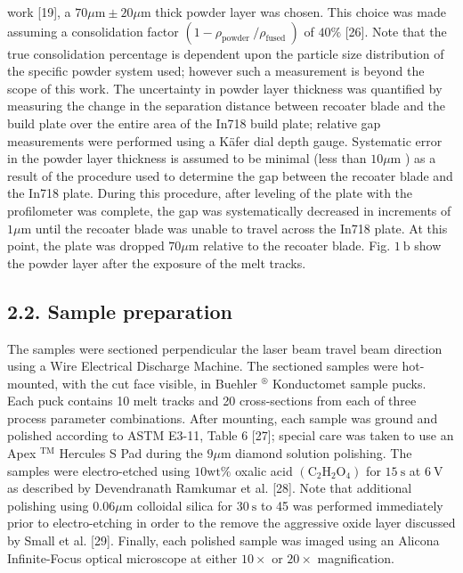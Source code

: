 \documentclass[10pt]{article}
\begin{document}
work [19], a $70 \mu \mathrm{m} \pm 20 \mu \mathrm{m}$ thick powder layer was chosen. This choice was made assuming a consolidation factor $\left(1-\rho_{\text {powder }} / \rho_{\text {fused }}\right)$ of $40 \%$ [26]. Note that the true consolidation percentage is dependent upon the particle size distribution of the specific powder system used; however such a measurement is beyond the scope of this work. The uncertainty in powder layer thickness was quantified by measuring the change in the separation distance between recoater blade and the build plate over the entire area of the In718 build plate; relative gap measurements were performed using a Käfer dial depth gauge. Systematic error in the powder layer thickness is assumed to be minimal (less than $10 \mu \mathrm{m}$ ) as a result of the procedure used to determine the gap between the recoater blade and the In718 plate. During this procedure, after leveling of the plate with the profilometer was complete, the gap was systematically decreased in increments of $1 \mu \mathrm{m}$ until the recoater blade was unable to travel across the In718 plate. At this point, the plate was dropped $70 \mu \mathrm{m}$ relative to the recoater blade. Fig. $1 \mathrm{~b}$ show the powder layer after the exposure of the melt tracks.

\subsection*{2.2. Sample preparation}
The samples were sectioned perpendicular the laser beam travel beam direction using a Wire Electrical Discharge Machine. The sectioned samples were hot-mounted, with the cut face visible, in Buehler ${ }^{\circledR}$ Konductomet sample pucks. Each puck contains 10 melt tracks and 20 cross-sections from each of three process parameter combinations. After mounting, each sample was ground and polished according to ASTM E3-11, Table 6 [27]; special care was taken to use an Apex ${ }^{\mathrm{TM}}$ Hercules S Pad during the $9 \mu \mathrm{m}$ diamond solution polishing. The samples were electro-etched using $10 \mathrm{wt} \%$ oxalic acid $\left(\mathrm{C}_{2} \mathrm{H}_{2} \mathrm{O}_{4}\right)$ for $15 \mathrm{~s}$ at $6 \mathrm{~V}$ as described by Devendranath Ramkumar et al. [28]. Note that additional polishing using $0.06 \mu \mathrm{m}$ colloidal silica for $30 \mathrm{~s}$ to 45 was performed immediately prior to electro-etching in order to the remove the aggressive oxide layer discussed by Small et al. [29]. Finally, each polished sample was imaged using an Alicona Infinite-Focus optical microscope at either $10 \times$ or $20 \times$ magnification.
\end{document}
